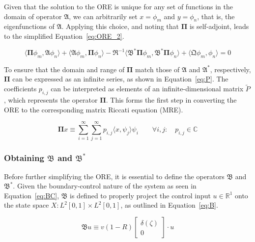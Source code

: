 Given that the solution to the ORE is unique for any set of functions in the domain of operator $\mathfrak{A}$, we can arbitrarily set ${x} = {\phi_m}$ and ${y} = {\phi_n}$, that is, the eigenfunctions of $\mathfrak{A}$. Applying this choice, and noting that $\mathbf{\Pi}$ is self-adjoint, leads to the simplified Equation~\ref{eq:ORE_2}.

\begin{equation} \label{eq:ORE_2}
    \langle \mathbf{\Pi} {\phi_m}, \mathfrak{A} {\phi_n} \rangle
    + \langle \mathfrak{A} {\phi_m}, \mathbf{\Pi} {\phi_n} \rangle
    - \mathfrak{R}^{-1} \langle \mathfrak{B}^* \mathbf{\Pi} {\phi_m}, \mathfrak{B}^* \mathbf{\Pi} {\phi_n} \rangle 
    + \langle \mathfrak{Q} {\phi_m}, {\phi_n} \rangle = 0
\end{equation}

To ensure that the domain and range of $\mathbf{\Pi}$ match those of $\mathfrak{A}$ and $\mathfrak{A}^*$, respectively, $\mathbf{\Pi}$ can be expressed as an infinite series, as shown in Equation~\ref{eq:P}. The coefficients $p_{i,j}$ can be interpreted as elements of an infinite-dimensional matrix $\tilde{P}$, which represents the operator $\mathbf{\Pi}$. This forms the first step in converting the ORE to the corresponding matrix Riccati equation (MRE).

\begin{equation} \label{eq:P}
    \mathbf{\Pi} {x} \equiv \sum_{i=1}^{\infty}\sum_{j=1}^{\infty} p_{i,j} \langle {x}, {\psi_j} \rangle {\psi_i} \qquad
    \forall {i,j}: \quad p_{i,j} \in \mathbb{C}
\end{equation}

\subsubsection{Obtaining $\mathfrak{B}$ and $\mathfrak{B}^*$}

Before further simplifying the ORE, it is essential to define the operators $\mathfrak{B}$ and $\mathfrak{B}^*$. Given the boundary-control nature of the system as seen in Equation~\ref{eq:BC}, $\mathfrak{B}$ is defined to properly project the control input $u \in \mathbb{R}^1$ onto the state space $X: L^2[0,1] \times L^2[0,1]$, as outlined in Equation~\ref{eq:B}.

\begin{equation} \label{eq:B}
    \mathfrak{B} u \equiv v(1-R)
    \begin{bmatrix}
        \delta(\zeta) \\ 0
    \end{bmatrix} \cdot u
\end{equation}

